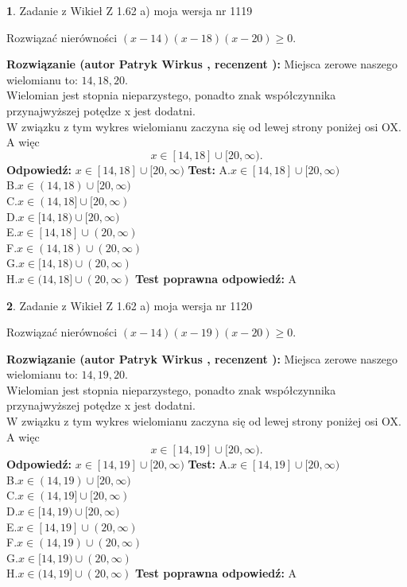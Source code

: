 \documentclass[12pt, a4paper]{article}
\theoremstyle{definition} %
\newtheorem{zad}{}
\newcommand{\zadStart}[1]{\begin{zad}#1\newline}
\newcommand{\zadStop}{\end{zad}}
\newcommand{\rozwStart}[2]{\noindent \textbf{Rozwiązanie (autor #1 , recenzent #2): }\newline}
\newcommand{\rozwStop}{\newline}
\newcommand{\odpStart}{\noindent \textbf{Odpowiedź:}\newline}
\newcommand{\odpStop}{\newline}
\newcommand{\testStart}{\noindent \textbf{Test:}\newline}
\newcommand{\testStop}{\newline}
\newcommand{\kluczStart}{\noindent \textbf{Test poprawna odpowiedź:}\newline}
\newcommand{\kluczStop}{\newline}
\begin{document}
\zadStart{Zadanie z Wikieł Z 1.62 a) moja wersja nr 1119}

Rozwiązać nierówności $(x-14)(x-18)(x-20)\ge0$.
\zadStop
\rozwStart{Patryk Wirkus}{}
Miejsca zerowe naszego wielomianu to: $14, 18, 20$.\\
Wielomian jest stopnia nieparzystego, ponadto znak współczynnika przy\linebreak najwyższej potędze x jest dodatni.\\ W związku z tym wykres wielomianu zaczyna się od lewej strony poniżej osi OX. A więc $$x \in [14,18] \cup [20,\infty).$$
\rozwStop
\odpStart
$x \in [14,18] \cup [20,\infty)$
\odpStop
\testStart
A.$x \in [14,18] \cup [20,\infty)$\\
B.$x \in (14,18) \cup [20,\infty)$\\
C.$x \in (14,18] \cup [20,\infty)$\\
D.$x \in [14,18) \cup [20,\infty)$\\
E.$x \in [14,18] \cup (20,\infty)$\\
F.$x \in (14,18) \cup (20,\infty)$\\
G.$x \in [14,18) \cup (20,\infty)$\\
H.$x \in (14,18] \cup (20,\infty)$
\testStop
\kluczStart
A
\kluczStop



\zadStart{Zadanie z Wikieł Z 1.62 a) moja wersja nr 1120}

Rozwiązać nierówności $(x-14)(x-19)(x-20)\ge0$.
\zadStop
\rozwStart{Patryk Wirkus}{}
Miejsca zerowe naszego wielomianu to: $14, 19, 20$.\\
Wielomian jest stopnia nieparzystego, ponadto znak współczynnika przy\linebreak najwyższej potędze x jest dodatni.\\ W związku z tym wykres wielomianu zaczyna się od lewej strony poniżej osi OX. A więc $$x \in [14,19] \cup [20,\infty).$$
\rozwStop
\odpStart
$x \in [14,19] \cup [20,\infty)$
\odpStop
\testStart
A.$x \in [14,19] \cup [20,\infty)$\\
B.$x \in (14,19) \cup [20,\infty)$\\
C.$x \in (14,19] \cup [20,\infty)$\\
D.$x \in [14,19) \cup [20,\infty)$\\
E.$x \in [14,19] \cup (20,\infty)$\\
F.$x \in (14,19) \cup (20,\infty)$\\
G.$x \in [14,19) \cup (20,\infty)$\\
H.$x \in (14,19] \cup (20,\infty)$
\testStop
\kluczStart
A
\kluczStop
\end{document}
